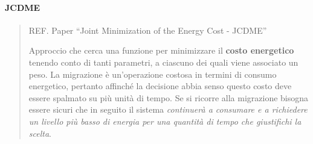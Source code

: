\documentclass{article}
\begin{document}
		\paragraph{JCDME}
		\begin{quote}
		REF. Paper ``Joint Minimization of the Energy Cost -
		JCDME''
		
		Approccio che cerca una funzione per minimizzare il \textbf{costo
		energetico} tenendo conto di tanti parametri, a
		ciascuno dei quali viene associato un peso. La
		migrazione è un'operazione costosa in termini
		di consumo energetico, pertanto affinché la decisione
		abbia senso questo costo deve essere spalmato su più unità
		di tempo. Se si ricorre alla migrazione bisogna essere sicuri che in
		seguito il sistema \emph{continuerà a consumare e a richiedere un
		livello più basso di energia per una quantità di tempo che giustifichi
		la scelta}.
		\end{quote}
\end{document}
